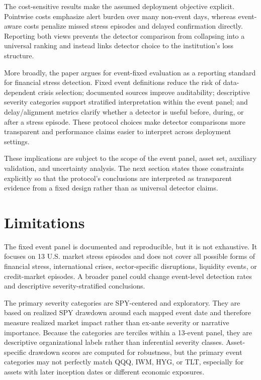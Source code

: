 \documentclass[pdflatex,sn-mathphys-num]{sn-jnl}
\begin{document}
The cost-sensitive results make the assumed deployment objective explicit. Pointwise costs emphasize alert burden over many non-event days, whereas event-aware costs penalize missed stress episodes and delayed confirmation directly. Reporting both views prevents the detector comparison from collapsing into a universal ranking and instead links detector choice to the institution's loss structure.

More broadly, the paper argues for event-fixed evaluation as a reporting standard for financial stress detection. Fixed event definitions reduce the risk of data-dependent crisis selection; documented sources improve auditability; descriptive severity categories support stratified interpretation within the event panel; and delay/alignment metrics clarify whether a detector is useful before, during, or after a stress episode. These protocol choices make detector comparisons more transparent and performance claims easier to interpret across deployment settings.

These implications are subject to the scope of the event panel, asset set, auxiliary validation, and uncertainty analysis. The next section states those constraints explicitly so that the protocol's conclusions are interpreted as transparent evidence from a fixed design rather than as universal detector claims.

\section{Limitations}
The fixed event panel is documented and reproducible, but it is not exhaustive. It focuses on 13 U.S. market stress episodes and does not cover all possible forms of financial stress, international crises, sector-specific disruptions, liquidity events, or credit-market episodes. A broader panel could change event-level detection rates and descriptive severity-stratified conclusions.

The primary severity categories are SPY-centered and exploratory. They are based on realized SPY drawdown around each mapped event date and therefore measure realized market impact rather than ex-ante severity or narrative importance. Because the categories are terciles within a 13-event panel, they are descriptive organizational labels rather than inferential severity classes. Asset-specific drawdown scores are computed for robustness, but the primary event categories may not perfectly match QQQ, IWM, HYG, or TLT, especially for assets with later inception dates or different economic exposures.
\end{document}
